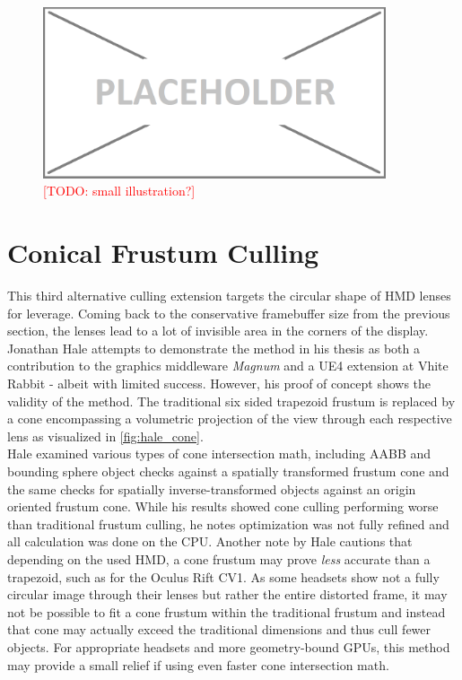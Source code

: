 \begin{figure}[htb]
  \centering
  \includegraphics[width=0.9\textwidth]{pictures/placeholder}
  \caption{\textcolor{red}{[TODO: small illustration?]}} \label{fig:blob}
\end{figure}

\section{Conical Frustum Culling}
This third alternative culling extension targets the circular shape of HMD lenses for leverage. Coming back to the conservative framebuffer size from the previous section, the lenses lead to a lot of invisible area in the corners of the display. Jonathan Hale attempts to demonstrate the method in his thesis \cite{Hale.2018} as both a contribution to the graphics middleware \textit{Magnum}\cite{Vondrus.30.10.2019} and a UE4 extension at Vhite Rabbit\cite{VhiteRabbit.08.01.2020} - albeit with limited success. However, his proof of concept shows the validity of the method. The traditional six sided trapezoid frustum is replaced by a cone encompassing a volumetric projection of the view through each respective lens as visualized in \autoref{fig:hale_cone}. \\
Hale examined various types of cone intersection math, including AABB and bounding sphere object checks against a spatially transformed frustum cone and the same checks for spatially inverse-transformed objects against an origin oriented frustum cone. While his results showed cone culling performing worse than traditional frustum culling, he notes optimization was not fully refined and all calculation was done on the CPU. 
Another note by Hale cautions that depending on the used HMD, a cone frustum may prove \textit{less} accurate than a trapezoid, such as for the Oculus Rift CV1. As some headsets show not a fully circular image through their lenses but rather the entire distorted frame, it may not be possible to fit a cone frustum within the traditional frustum and instead that cone may actually exceed the traditional dimensions and thus cull fewer objects. 
For appropriate headsets and more geometry-bound GPUs, this method may provide a small relief if using even faster cone intersection math. 

